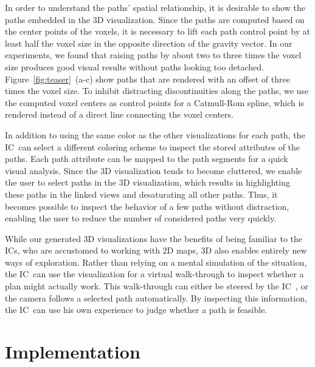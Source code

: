 \documentclass[conference,10pt,letter]{IEEEtran}
\def\IC{IC}
\begin{document}
 In order to understand the paths' spatial relationship, it is desirable to show the paths embedded in the 3D visualization. Since the paths are computed based on the center points of the voxels, it is necessary to lift each path control point by at least half the voxel size in the opposite direction of the gravity vector. In our experiments, we found that raising paths by about two to three times the voxel size produces good visual results without paths looking too detached. Figure~\ref{fig:teaser}~(a-c) show paths that are rendered with an offset of three times the voxel size. To inhibit distracting discontinuities along the paths, we use the computed voxel centers as control points for a Catmull-Rom spline, which is rendered instead of a direct line connecting the voxel centers. 

In addition to using the same color as the other visualizations for each path, the \IC\ can select a different coloring scheme to inspect the stored attributes of the paths. Each path attribute can be mapped to the path segments for a quick visual analysis. Since the 3D visualization tends to become cluttered, we enable the user to select paths in the 3D visualization, which results in highlighting these paths in the linked views and desaturating all other paths. Thus, it becomes possible to inspect the behavior of a few paths without distraction, enabling the user to reduce the number of considered paths very quickly.

While our generated 3D visualizations have the benefits of being familiar to the \IC s, who are accustomed to working with 2D maps, 3D also enables entirely new ways of exploration. Rather than relying on a mental simulation of the situation, the \IC\ can use the visualization for a virtual walk-through to inspect whether a plan might actually work. This walk-through can either be steered by the \IC\ , or the camera follows a selected path automatically. By inspecting this information, the \IC\ can use his own experience to judge whether a path is feasible.


\section{Implementation} \label{sec:implementation}
\end{document}
